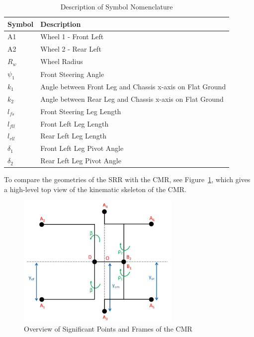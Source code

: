 \begin{table}[H]
\begin{center}\label{table:2}
	\begin{tabular}{| >{\centering\arraybackslash} m{1.2in} | >{\centering\arraybackslash} m{4.5in} |} 
		\hline
		Symbol & Description \\
		\hline
		A1 & Wheel 1 - Front Left \\
		A2 & Wheel 2 - Rear Left \\
		$R_{w}$ & Wheel Radius \\
		$\psi_{1}$ & Front Steering Angle \\
		$k_{1}$ & Angle between Front Leg and Chassis x-axis on Flat Ground \\
		$k_{2}$ & Angle between Rear Leg and Chassis x-axis on Flat Ground \\
		$l_{fs}$ & Front Steering Leg Length \\ 
		$l_{fll}$ & Front Left Leg Length \\ 
		$l_{rll}$ & Rear Left Leg Length \\ 
		$\delta_{1}$ & Front Left Leg Pivot Angle    \\
		$\delta_{2}$ & Rear Left Leg Pivot Angle   \\
		\hline
	
	\end{tabular}
\caption{Description of Symbol Nomenclature}
\end{center}
\end{table}

To compare the geometries of the \ac{SRR} with the \ac{CMR}, see Figure~\ref{traction_control:discussion:cmr-skeleton}, which gives a high-level top view of the kinematic skeleton of the \ac{CMR}.

\begin{figure}[H]
	\centering
	\includegraphics[width=0.7\textwidth]{sections/discussion/images/cmr_skeleton.png}	
	\caption{Overview of Significant Points and Frames of the \acl{CMR}}	
	\label{traction_control:discussion:cmr-skeleton}
\end{figure}

